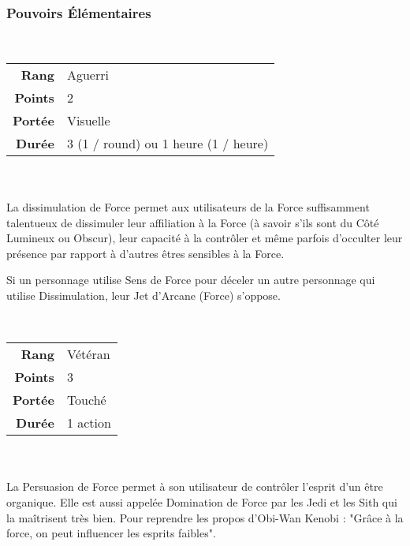 \subsubsection{Pouvoirs \'Elémentaires}
\begin{description}[align=left] 

    \item [Dissimulation de Force] ~ \\

        \begin{tabular}{ r l }
            \textbf{Rang}    & Aguerri \\
            \textbf{Points}  & 2 \\
            \textbf{Portée}  & Visuelle \\
            \textbf{Durée}   & 3 (1 / round) ou 1 heure (1 / heure) \\
        \end{tabular}
        \\ \\
		La dissimulation de Force permet aux utilisateurs de la Force suffisamment talentueux de dissimuler leur affiliation à la Force (à savoir s’ils sont du Côté Lumineux ou Obscur), leur capacité à la contrôler et même parfois d’occulter leur présence par rapport à d’autres êtres sensibles à la Force. 

		Si un personnage utilise Sens de Force pour déceler un autre personnage qui utilise Dissimulation, leur Jet d’Arcane (Force) s’oppose.
        \\

	\item [Persuasion de Force] ~ \\

        \begin{tabular}{ r l }
            \textbf{Rang}    & Vétéran \\
            \textbf{Points}  & 3 \\
            \textbf{Portée}  & Touché \\
            \textbf{Durée}   & 1 action \\
        \end{tabular}
        \\ \\
		La Persuasion de Force permet à son utilisateur de contrôler l’esprit d’un être organique. Elle est aussi appelée Domination de Force par les Jedi et les Sith qui la maîtrisent très bien. Pour reprendre les propos d’Obi-Wan Kenobi : "Grâce à la force, on peut influencer les esprits faibles". 


\end{description}
